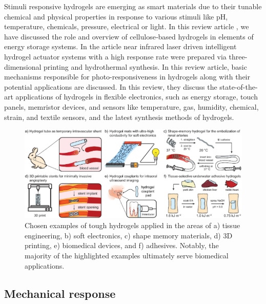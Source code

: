 Stimuli responsive hydrogels are emerging as smart materials due to their tunable chemical and physical properties in response to various stimuli like pH, temperature, chemicals, pressure, electrical or light. 
In this review article \citep{bishnoiCellulosebasedSmartMaterials2024}, we have discussed the role and overview of cellulose‐based hydrogels in elements of energy storage systems.
In the article \citep{zhaoIntelligentHydrogelActuators2021} near infrared laser driven intelligent hydrogel actuator systems with a high response rate were prepared via three-dimensional printing and hydrothermal synthesis.
In this review article\citep{shomePhotoresponsiveSmartHydrogels2024}, basic mechanisms responsible for photo-responsiveness in hydrogels along with their potential applications are discussed.
In this review\citep{duttaSmartMaterialsFlexible2024}, they discuss the state-of-the-art applications of hydrogels in flexible electronics, such as energy storage, touch panels, memristor devices, and sensors like temperature, gas, humidity, chemical, strain, and textile sensors, and the latest synthesis methods of hydrogels.

\begin{figure}[ht!]
    \centering
    \includegraphics[width=\textwidth]{figs/applications.png}
    \caption{Chosen examples of tough hydrogels applied in the areas of a) tissue engineering, b) soft electronics, c) shape memory materials, d) 3D printing, e) biomedical devices, and f) adhesives. Notably, the majority of the highlighted examples ultimately serve biomedical applications\citep{petelinsekToughHydrogelsLoadBearing2024}.}\label{fig:applications}
\end{figure}


\subsection{Mechanical response}

